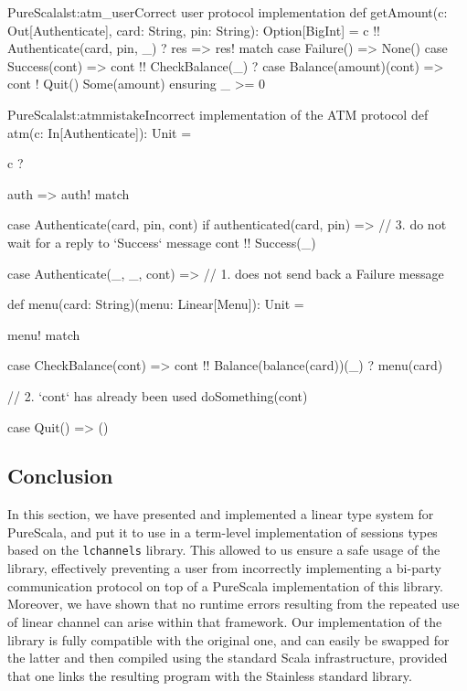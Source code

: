\documentclass[a4paper,twoside]{article}
\newcommand{\stt}[1]{\texttt{\small{#1}}}
\begin{document}
\begin{Code}{PureScala}{lst:atm_user}{Correct user protocol implementation}
def getAmount(c: Out[Authenticate], card: String, pin: String): Option[BigInt] = {
  c !! Authenticate(card, pin, _) ? { res =>
    res! match {
      case Failure() => None()
      case Success(cont) => cont !! CheckBalance(_) ? {
        case Balance(amount)(cont) =>
          cont ! Quit()
          Some(amount)
      }
    }
  }
} ensuring { _ >= 0 }
\end{Code}

\begin{Code}{PureScala}{lst:atmmistake}{Incorrect implementation of the ATM protocol}
def atm(c: In[Authenticate]): Unit = {
  c ? { auth => auth! match {  
    case Authenticate(card, pin, cont) if authenticated(card, pin) =>
      // 3. do not wait for a reply to `Success` message
      cont !! Success(_)
  
    case Authenticate(_, _, cont) =>
      // 1. does not send back a Failure message

  } }
}

def menu(card: String)(menu: Linear[Menu]): Unit = {
  menu! match {
    case CheckBalance(cont) =>
      cont !! Balance(balance(card))(_) ? menu(card)
      
      // 2. `cont` has already been used
      doSomething(cont)

    case Quit() => ()
  }
}
\end{Code}

%

\subsection{Conclusion}

In this section, we have presented and implemented a linear type system for PureScala, and put it to use in a term-level implementation of sessions types based on the \stt{lchannels} library. This allowed to us ensure a safe usage of the library, effectively preventing a user from incorrectly implementing a bi-party communication protocol on top of a PureScala implementation of this library. Moreover, we have shown that no runtime errors resulting from the repeated use of linear channel can arise within that framework. Our implementation of the library is fully compatible with the original one, and can easily be swapped for the latter and then compiled using the standard Scala infrastructure, provided that one links the resulting program with the Stainless standard library.
\end{document}
